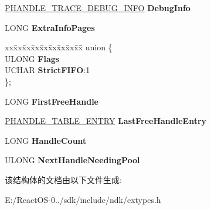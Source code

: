 \begin{DoxyCompactItemize}
\hyperlink{struct___h_a_n_d_l_e___t_r_a_c_e___d_e_b_u_g___i_n_f_o}{P\+H\+A\+N\+D\+L\+E\+\_\+\+T\+R\+A\+C\+E\+\_\+\+D\+E\+B\+U\+G\+\_\+\+I\+N\+FO} {\bfseries Debug\+Info}
\item 
\mbox{\label{struct___h_a_n_d_l_e___t_a_b_l_e_a2fb2c32b0d8a2dd60fabb7e361c78636}} 
L\+O\+NG {\bfseries Extra\+Info\+Pages}
\item 
\mbox{\label{struct___h_a_n_d_l_e___t_a_b_l_e_abc8fa1b342b24431ed3ceffb29cb8724}} 
\begin{tabbing}
xx\=xx\=xx\=xx\=xx\=xx\=xx\=xx\=xx\=\kill
union \{\\
\>ULONG {\bfseries Flags}\\
\>UCHAR {\bfseries StrictFIFO}:1\\
\}; \\

\end{tabbing}\item 
\mbox{\label{struct___h_a_n_d_l_e___t_a_b_l_e_a6a83f079bc27c0819df177cbb2877fac}} 
L\+O\+NG {\bfseries First\+Free\+Handle}
\item 
\mbox{\label{struct___h_a_n_d_l_e___t_a_b_l_e_a9fe867d6fa3af5ba46323e9878b42958}} 
\hyperlink{struct___h_a_n_d_l_e___t_a_b_l_e___e_n_t_r_y}{P\+H\+A\+N\+D\+L\+E\+\_\+\+T\+A\+B\+L\+E\+\_\+\+E\+N\+T\+RY} {\bfseries Last\+Free\+Handle\+Entry}
\item 
\mbox{\label{struct___h_a_n_d_l_e___t_a_b_l_e_a0f2e8f52535719f3a87320f22188f451}} 
L\+O\+NG {\bfseries Handle\+Count}
\item 
\mbox{\label{struct___h_a_n_d_l_e___t_a_b_l_e_ab74299244d4a4b15e5a63710f67b10fc}} 
U\+L\+O\+NG {\bfseries Next\+Handle\+Needing\+Pool}
\end{DoxyCompactItemize}


该结构体的文档由以下文件生成\+:\begin{DoxyCompactItemize}
\item 
E\+:/\+React\+O\+S-\/0../sdk/include/ndk/extypes.\+h\end{DoxyCompactItemize}
